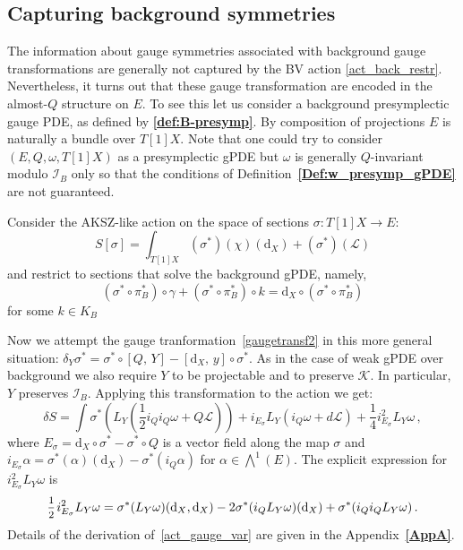 \documentclass[a4paper,12pt]{article}
\numberwithin{equation}{section} %
\newcommand{\bref}[1]{\textbf{\ref{#1}}}
\newcommand{\dx}{\mathrm{d}_X}
\newcommand{\commut}[2]{[#1{,}\,#2]}
\newcommand{\half}{\mathchoice{%
    \ffrac{1}{2}}{\frac{1}{2}}{\frac{1}{2}}{\frac{1}{2}}}
\newcommand{\ffrac}[2]{\raisebox{.5pt}%
  {\footnotesize$\displaystyle\frac{#1}{#2}$}\kern1pt}
\def\cI{\mathcal{I}}
\def\cK{\mathcal{K}}
\def\cL{\mathcal{L}}
\begin{document}
\subsection{Capturing background symmetries}\label{sec:capturing}

The information about gauge symmetries associated with background gauge transformations are generally not captured by the BV action \eqref{act_back_restr}. Nevertheless, it turns out that these gauge transformation are encoded in the almost-$Q$ structure on $E$.  To see this let us  consider a background presymplectic gauge PDE, as defined by \bref{def:B-presymp}. By composition of projections $E$ is naturally a bundle over $T[1]X$. Note that one could try to consider $(E,Q,\omega,T[1]X)$ as a presymplectic gPDE but $\omega$ is generally $Q$-invariant modulo $\cI_B$ only so that the conditions of Definition~\bref{Def:w_presymp_gPDE} are not guaranteed. 


Consider the AKSZ-like action on the space of sections $\sigma:T[1]X\to E$:
\begin{equation} \label{act_3}
    S[\sigma]= \int_{T[1]X} (\sigma^*)(\chi)(\dx) + (\sigma^*)(\cL)
\end{equation}
and restrict to sections that solve the background gPDE, namely,
\begin{equation}
    (\sigma^* \circ \pi_B^*) \circ \gamma + (\sigma^* \circ \pi_B^*) \circ k  = \dx \circ (\sigma^* \circ \pi_B^*)
\end{equation}
for some $k\in K_B$

Now we attempt the gauge tranformation~\eqref{gaugetransf2} in this more general situation:
$\delta_Y\sigma^{*}={\sigma}^{*}\circ \commut{Q}{Y}-\commut{\dx}{y}\circ \sigma^*$. As in the case of weak gPDE over background we also require $Y$ to be projectable and to preserve $\cK$. In particular, $Y$ preserves $\cI_B$. Applying this transformation to the action we get:
\begin{equation}\label{act_gauge_var}
    \delta S = \int \sigma^*(L_Y(\frac{1}{2}i_Qi_Q\omega + Q\cL)) + i_{E_\sigma}L_Y(i_Q\omega + d\cL) + \frac{1}{4}i^2_{E_\sigma} L_Y\omega\,,
\end{equation}
where $E_{\sigma} = \dx\circ\sigma^* - \sigma^* \circ Q$ is a vector field along the map $\sigma$ and $i_{E_\sigma}\alpha = \sigma^*(\alpha)(\dx) - \sigma^*(i_Q\alpha)$ for $\alpha \in \bigwedge^1(E)$. The explicit expression for $i^2_{E_\sigma}L_Y\omega$ is 
\begin{equation*}
    \half i^2_{E_\sigma}L_Y\omega = \sigma^*(L_Y\omega)(\dx, \dx) - 2\sigma^*(i_QL_Y\omega)(\dx) + \sigma^*(i_Q i_Q L_Y \omega)\,.
\end{equation*}
Details of the derivation of~\eqref{act_gauge_var} are given in the Appendix~\bref{AppA}.
\end{document}
